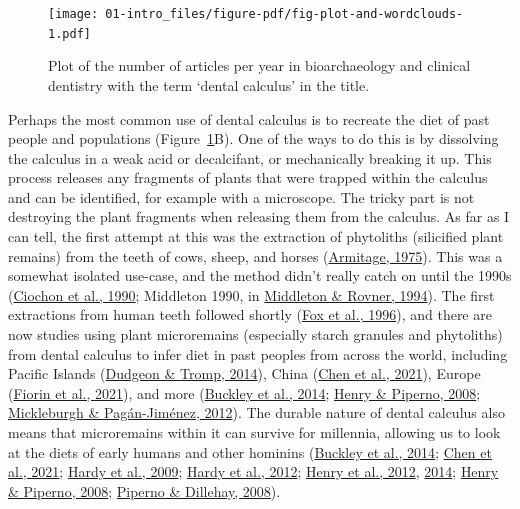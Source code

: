 \documentclass[
  b5paper,
]{book}
\begin{document}
\begin{figure}

{\centering \texttt{[image: 01-intro\_files/figure-pdf/fig-plot-and-wordclouds-1.pdf]}

}

\caption{\label{fig-plot-and-wordclouds}Plot of the number of articles
per year in bioarchaeology and clinical dentistry with the term `dental
calculus' in the title.}

\end{figure}

Perhaps the most common use of dental calculus is to recreate the diet
of past people and populations (Figure~\ref{fig-plot-and-wordclouds}B).
One of the ways to do this is by dissolving the calculus in a weak acid
or decalcifant, or mechanically breaking it up. This process releases
any fragments of plants that were trapped within the calculus and can be
identified, for example with a microscope. The tricky part is not
destroying the plant fragments when releasing them from the calculus. As
far as I can tell, the first attempt at this was the extraction of
phytoliths (silicified plant remains) from the teeth of cows, sheep, and
horses
(\protect\hyperlink{ref-armitageExtractionIdentification1975}{Armitage,
1975}). This was a somewhat isolated use-case, and the method didn't
really catch on until the 1990s
(\protect\hyperlink{ref-ciochonOpalPhytoliths1990}{Ciochon et al.,
1990}; Middleton 1990, in
\protect\hyperlink{ref-middletonOpalPhytoliths1994}{Middleton \& Rovner,
1994}). The first extractions from human teeth followed shortly
(\protect\hyperlink{ref-foxPhytolithCalculus1996}{Fox et al., 1996}),
and there are now studies using plant microremains (especially starch
granules and phytoliths) from dental calculus to infer diet in past
peoples from across the world, including Pacific Islands
(\protect\hyperlink{ref-dudgeonDietGeography2014}{Dudgeon \& Tromp,
2014}), China (\protect\hyperlink{ref-chenStarchGrains2021}{Chen et al.,
2021}), Europe (\protect\hyperlink{ref-fiorinCombiningDental2021}{Fiorin
et al., 2021}), and more
(\protect\hyperlink{ref-buckleyDentalCalculus2014}{Buckley et al.,
2014}; \protect\hyperlink{ref-henryCalculusSyria2008}{Henry \& Piperno,
2008}; \protect\hyperlink{ref-mickleburghNewInsights2012}{Mickleburgh \&
Pagán-Jiménez, 2012}). The durable nature of dental calculus also means
that microremains within it can survive for millennia, allowing us to
look at the diets of early humans and other hominins
(\protect\hyperlink{ref-buckleyDentalCalculus2014}{Buckley et al.,
2014}; \protect\hyperlink{ref-chenStarchGrains2021}{Chen et al., 2021};
\protect\hyperlink{ref-hardyStarchGranules2009}{Hardy et al., 2009};
\protect\hyperlink{ref-hardyNeanderthalMedics2012}{Hardy et al., 2012};
\protect\hyperlink{ref-henryDietAustralopithecus2012}{Henry et al.,
2012}, \protect\hyperlink{ref-henryNeanderthalCalculus2014}{2014};
\protect\hyperlink{ref-henryCalculusSyria2008}{Henry \& Piperno, 2008};
\protect\hyperlink{ref-pipernoStarchGrains2008}{Piperno \& Dillehay,
2008}).
\end{document}
